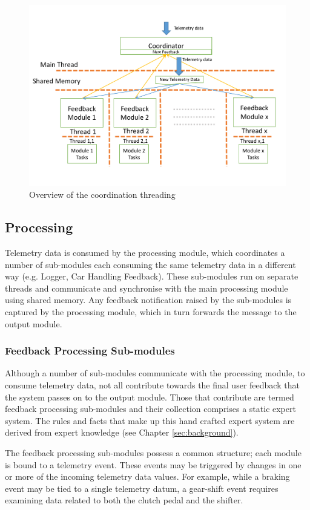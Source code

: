 \begin{figure}[!htb]
	\centering
	\includegraphics[width=\textwidth]{diagrams/multithreading.pdf}
	\caption{Overview of the coordination threading}
	\label{fig:multithreading}
\end{figure}

\subsection{Processing}
Telemetry data is consumed by the processing module, which coordinates a number of sub-modules each consuming the same telemetry data in a different way (e.g. Logger, Car Handling Feedback). These sub-modules run on separate threads and communicate and synchronise with the main processing module using shared memory. Any feedback notification raised by the sub-modules is captured by the processing module, which in turn forwards the message to the output module.

\subsubsection{Feedback Processing Sub-modules}
Although a number of sub-modules communicate with the processing module, to consume telemetry data, not all contribute towards the final user feedback that the system passes on to the output module. Those that contribute are termed feedback processing sub-modules and their collection comprises a static expert system. The rules and facts that make up this hand crafted expert system are derived from expert knowledge (see Chapter \ref{sec:background}).

The feedback processing sub-modules possess a common structure; each module is bound to a telemetry event. These events may be triggered by changes in one or more of the incoming telemetry data values. For example, while a braking event may be tied to a single telemetry datum, a gear-shift event requires examining data related to both the clutch pedal and the shifter. 

